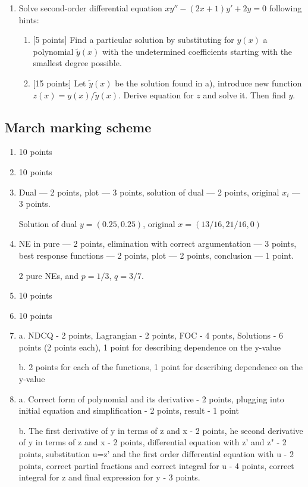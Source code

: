 \begin{enumerate}
\item Solve second-order differential equation $xy''-(2x+1)y'+2y=0$ following hints:
	\begin{enumerate}[label=\alph*)]
	    \item {[5 points]} Find a particular solution by substituting for $y(x)$ a polynomial $\tilde y(x)$ with
	      the undetermined coefficients starting with the smallest degree possible.
	    \item {[15 points]} Let $\tilde y(x)$  be the solution found in a),  introduce new function $z(x)=y(x)/\tilde y(x)$.
	      Derive equation for $z$ and solve it. Then find $y$.
	  \end{enumerate}


\end{enumerate}

\subsection{March marking scheme}

\begin{enumerate}

\item 10 points
\item 10 points
\item Dual — 2 points, plot — 3 points, solution of dual — 2 points, original $x_i$ — 3 points.

Solution of dual $y = (0.25, 0.25)$, original $x = (13/16, 21/16, 0)$

\item NE in pure — 2 points, elimination with correct argumentation — 3 points, best response functions — 2 points, plot — 2 points, conclusion — 1 point.

2 pure NEs, and $p=1/3$, $q=3/7$.

\item 10 points
\item 10 points

\item
a. NDCQ - 2 points, Lagrangian - 2 points, FOC - 4 ponts, Solutions  - 6 points (2 points each), 1 point for describing dependence on the y-value

b. 2 points for each of the functions, 1 point for describing dependence on the y-value

\item
a. Correct form of polynomial and its derivative - 2 points, plugging into initial equation and simplification - 2 points, result - 1 point

b. The first derivative of y in terms of z and x - 2 points, he second derivative of y in terms of z and x - 2 points, differential equation with z' and z" - 2 points, substitution u=z' and the first order differential equation with u - 2 points, correct partial fractions and correct integral for u - 4 points, correct integral for z and final expression for y - 3 points.


\end{enumerate}

